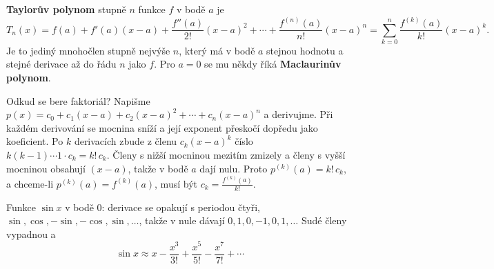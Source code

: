 \begin{definitionbox}
  \textbf{Taylorův polynom} stupně $n$ funkce $f$ v bodě $a$ je
  \begin{equation*}
    T_n(x) = f(a) + f'(a)(x - a) + \frac{f''(a)}{2!}{(x - a)}^2 + \cdots + \frac{f^{(n)}(a)}{n!}{(x - a)}^n = \sum_{k=0}^{n}\frac{f^{(k)}(a)}{k!}{(x - a)}^k.
  \end{equation*}
  Je to jediný mnohočlen stupně nejvýše $n$, který má v bodě $a$ stejnou hodnotu a stejné derivace až do řádu $n$ jako $f$. Pro $a = 0$ se mu někdy říká \textbf{Maclaurinův polynom}.
\end{definitionbox}

Odkud se bere faktoriál? Napišme $p(x) = c_0 + c_1(x - a) + c_2{(x - a)}^2 + \cdots + c_n{(x - a)}^n$ a derivujme. Při každém derivování se mocnina sníží a její exponent přeskočí dopředu jako koeficient. Po $k$ derivacích zbude z členu $c_k{(x - a)}^k$ číslo $k(k - 1)\cdots 1\cdot c_k = k!\,c_k$. Členy s nižší mocninou mezitím zmizely a členy s vyšší mocninou obsahují $(x - a)$, takže v bodě $a$ dají nulu. Proto $p^{(k)}(a) = k!\,c_k$, a chceme-li $p^{(k)}(a) = f^{(k)}(a)$, musí být $c_k = \frac{f^{(k)}(a)}{k!}$.

\begin{example}
  Funkce $\sin x$ v bodě $0$: derivace se opakují s periodou čtyři, $\sin, \cos, -\sin, -\cos, \sin, \dots$, takže v nule dávají $0, 1, 0, -1, 0, 1, \dots$ Sudé členy vypadnou a
  \begin{equation*}
    \sin x\approx x - \frac{x^3}{3!} + \frac{x^5}{5!} - \frac{x^7}{7!} + \cdots
  \end{equation*}
\end{example}

\begin{center}
\end{center}

